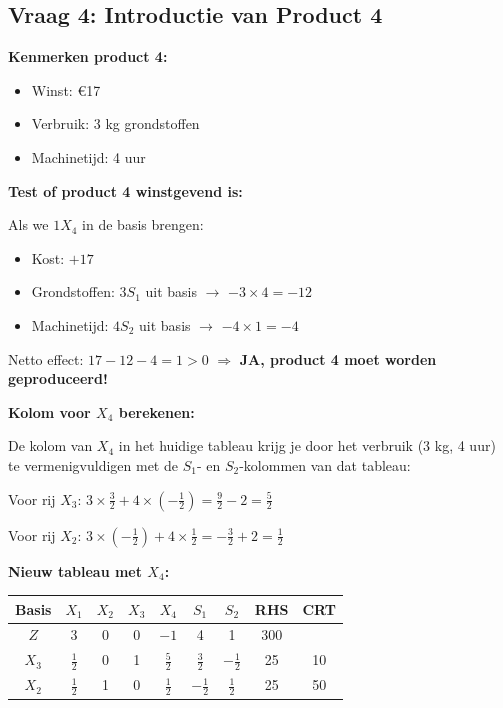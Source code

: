 \documentclass[a4paper,11pt]{article}
\begin{document}
\begin{oefenblok}
    \subsection*{Vraag 4: Introductie van Product 4}

    \textbf{Kenmerken product 4:}
    \begin{itemize}
        \item Winst: €17
        \item Verbruik: 3 kg grondstoffen
        \item Machinetijd: 4 uur
    \end{itemize}

    \textbf{Test of product 4 winstgevend is:}

    Als we $1 X_4$ in de basis brengen:
    \begin{itemize}
        \item Kost: $+17$
        \item Grondstoffen: $3 S_1$ uit basis $\rightarrow$ $-3 \times 4 = -12$
        \item Machinetijd: $4 S_2$ uit basis $\rightarrow$ $-4 \times 1 = -4$
    \end{itemize}

    Netto effect: $17 - 12 - 4 = 1 > 0$ $\Rightarrow$ \textbf{JA, product 4 moet worden geproduceerd!}

    \textbf{Kolom voor $X_4$ berekenen:}

    De kolom van $X_4$ in het huidige tableau krijg je door het verbruik (3 kg, 4 uur) te vermenigvuldigen
    met de $S_1$- en $S_2$-kolommen van dat tableau:

    Voor rij $X_3$: $3 \times \tfrac{3}{2} + 4 \times (-\tfrac{1}{2}) = \tfrac{9}{2} - 2 = \tfrac{5}{2}$

    Voor rij $X_2$: $3 \times (-\tfrac{1}{2}) + 4 \times \tfrac{1}{2} = -\tfrac{3}{2} + 2 = \tfrac{1}{2}$

    \textbf{Nieuw tableau met $X_4$:}

    \begin{center}
        \begin{tabular}{c|cccccc|c|c}
            \hline
            Basis & $X_1$         & $X_2$ & $X_3$ & $X_4$         & $S_1$          & $S_2$          & RHS & CRT \\
            \hline
            $Z$   & 3             & 0     & 0     & $-1$          & 4              & 1              & 300 &     \\
            $X_3$ & $\frac{1}{2}$ & 0     & 1     & $\frac{5}{2}$ & $\frac{3}{2}$  & $-\frac{1}{2}$ & 25  & 10  \\
            $X_2$ & $\frac{1}{2}$ & 1     & 0     & $\frac{1}{2}$ & $-\frac{1}{2}$ & $\frac{1}{2}$  & 25  & 50  \\
            \hline
        \end{tabular}
    \end{center}


\end{oefenblok}
\end{document}
